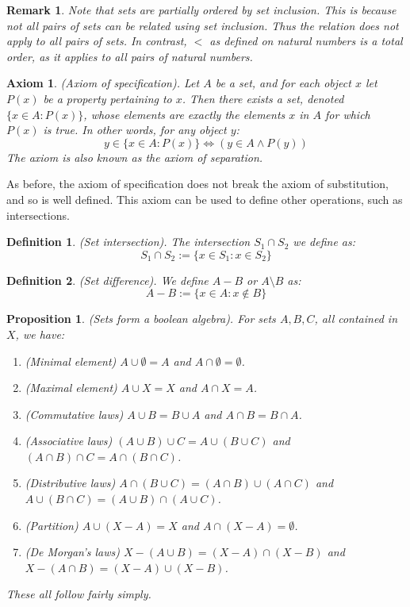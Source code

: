 \documentclass{article}
\newtheorem{definition}{Definition}[subsection]
\newtheorem{remark}{Remark}[subsection]
\newtheorem{axiom}{Axiom}[section]
\newtheorem{proposition}{Proposition}[subsection]
\let\it\textit
\begin{document}
\begin{remark}
	Note that sets are \it{partially} ordered by set inclusion. 
	This is because not all pairs of sets can be related using
	set inclusion. Thus the relation does not apply to all 
	pairs of sets. In contrast, $<$ as defined on natural 
	numbers is a \it{total} order, as it applies to all pairs
	of natural numbers.
\end{remark}

\begin{axiom}
	(Axiom of specification). Let $A$ be a set, and for each 
	object $x$ let $P(x)$ be a property pertaining to $x$. Then 
	there exists a set, denoted $\{x \in A : P(x) \}$, whose
	elements are exactly the elements $x$ in $A$ for which $P(x)$
	is true. In other words, for any object $y$:
	$$
	y \in \{x \in A : P(x) \} \iff (y \in A \land P(y))
	$$
	The axiom is also known as the axiom of separation.
\end{axiom}

As before, the axiom of specification does not break the axiom 
of substitution, and so is well defined. This axiom can be used 
to define other operations, such as intersections.

\begin{definition}
	(Set intersection). The intersection $S_1 \cap S_2$ we define as: 
	$$
	S_1 \cap S_2 := \{x \in S_1 : x \in S_2\}
	$$
\end{definition}

\begin{definition}
	(Set difference). We define $A - B$ or $A\setminus B$ as: 
	$$
	A - B := \{x \in A : x \notin B\} 
	$$
\end{definition}

\begin{proposition}
	(Sets form a boolean algebra). For sets $A,B,C$, all contained in $X$, 
	we have: 
	\begin{enumerate}
		\item (Minimal element) $A \cup \emptyset = A$ and $A \cap 
		\emptyset = \emptyset$.
		\item (Maximal element) $A \cup X = X$ and $A \cap X = A$.
		\item (Commutative laws) $A \cup B = B \cup A$ and $A \cap B = B \cap A$.
		\item (Associative laws) $(A \cup B) \cup C = A \cup (B \cup C)$ and $(A \cap B) \cap C = A \cap (B \cap C)$.
		\item (Distributive laws) $A \cap (B \cup C) = (A \cap B) \cup (A \cap C)$ and $A \cup (B \cap C) = (A \cup B) \cap (A \cup C)$.
		\item (Partition) $A \cup (X - A) = X$ and $A \cap (X - A) = \emptyset$.
		\item (De Morgan's laws) $X - (A \cup B) = (X - A) \cap (X - B)$ and $X - (A \cap B) = (X - A) \cup (X - B)$.
	\end{enumerate}
	These all follow fairly simply.
\end{proposition}
\end{document}
